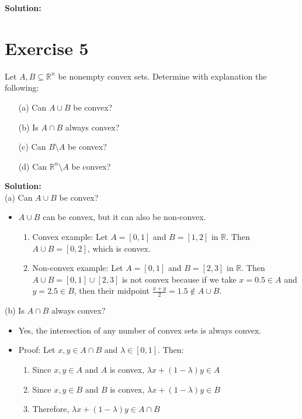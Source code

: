 \documentclass{article}
\begin{document}
\textbf{Solution:}

\newpage

\section*{Exercise 5}
Let $A, B \subseteq \mathbb{R}^n$ be nonempty convex sets. Determine with explanation the following:
\begin{enumerate}
\item[(a)] Can $A \cup B$ be convex?
\item[(b)] Is $A \cap B$ always convex?
\item[(c)] Can $B \setminus A$ be convex?
\item[(d)] Can $\mathbb{R}^n \setminus A$ be convex?
\end{enumerate}

\textbf{Solution:} \\

(a) Can $A \cup B$ be convex?
\begin{itemize}
\item $A \cup B$ can be convex, but it can also be non-convex.
    \begin{enumerate}
    \item Convex example: Let $A = [0,1]$ and $B = [1,2]$ in $\mathbb{R}$. Then $A \cup B = [0,2]$, which is convex.
    \item Non-convex example: Let $A = [0,1]$ and $B = [2,3]$ in $\mathbb{R}$. Then $A \cup B = [0,1] \cup [2,3]$ is not convex because if we take $x = 0.5 \in A$ and $y = 2.5 \in B$, then their midpoint $\frac{x+y}{2} = 1.5 \notin A \cup B$.
    \end{enumerate}
\end{itemize}

(b) Is $A \cap B$ always convex?
\begin{itemize}
\item Yes, the intersection of any number of convex sets is always convex.
\item Proof: Let $x, y \in A \cap B$ and $\lambda \in [0,1]$. Then:
    \begin{enumerate}
    \item Since $x,y \in A$ and $A$ is convex, $\lambda x + (1-\lambda)y \in A$
    \item Since $x,y \in B$ and $B$ is convex, $\lambda x + (1-\lambda)y \in B$
    \item Therefore, $\lambda x + (1-\lambda)y \in A \cap B$
    \end{enumerate}
\end{itemize}
\end{document}
